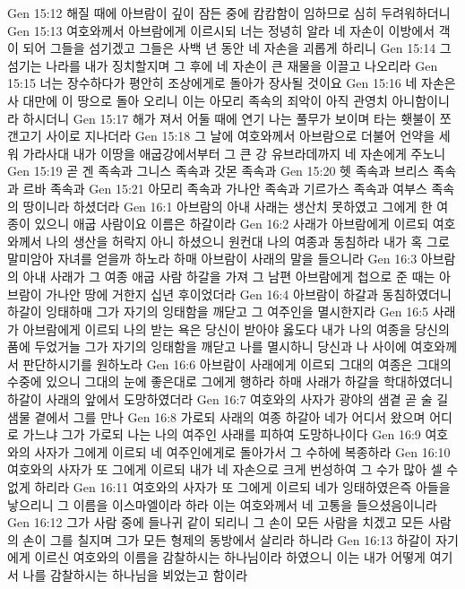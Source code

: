 Gen 15:12  해질 때에 아브람이 깊이 잠든 중에 캄캄함이 임하므로 심히 두려워하더니
Gen 15:13  여호와께서 아브람에게 이르시되 너는 정녕히 알라 네 자손이 이방에서 객이 되어 그들을 섬기겠고 그들은 사백 년 동안 네 자손을 괴롭게 하리니
Gen 15:14  그 섬기는 나라를 내가 징치할지며 그 후에 네 자손이 큰 재물을 이끌고 나오리라
Gen 15:15  너는 장수하다가 평안히 조상에게로 돌아가 장사될 것이요
Gen 15:16  네 자손은 사 대만에 이 땅으로 돌아 오리니 이는 아모리 족속의 죄악이 아직 관영치 아니함이니라 하시더니
Gen 15:17  해가 져서 어둘 때에 연기 나는 풀무가 보이며 타는 횃불이 쪼갠고기 사이로 지나더라
Gen 15:18  그 날에 여호와께서 아브람으로 더불어 언약을 세워 가라사대 내가 이땅을 애굽강에서부터 그 큰 강 유브라데까지 네 자손에게 주노니
Gen 15:19  곧 겐 족속과 그니스 족속과 갓몬 족속과
Gen 15:20  헷 족속과 브리스 족속과 르바 족속과
Gen 15:21  아모리 족속과 가나안 족속과 기르가스 족속과 여부스 족속의 땅이니라 하셨더라
Gen 16:1  아브람의 아내 사래는 생산치 못하였고 그에게 한 여종이 있으니 애굽 사람이요 이름은 하갈이라
Gen 16:2  사래가 아브람에게 이르되 여호와께서 나의 생산을 허락지 아니 하셨으니 원컨대 나의 여종과 동침하라 내가 혹 그로 말미암아 자녀를 얻을까 하노라 하매 아브람이 사래의 말을 들으니라
Gen 16:3  아브람의 아내 사래가 그 여종 애굽 사람 하갈을 가져 그 남편 아브람에게 첩으로 준 때는 아브람이 가나안 땅에 거한지 십년 후이었더라
Gen 16:4  아브람이 하갈과 동침하였더니 하갈이 잉태하매 그가 자기의 잉태함을 깨닫고 그 여주인을 멸시한지라
Gen 16:5  사래가 아브람에게 이르되 나의 받는 욕은 당신이 받아야 옳도다 내가 나의 여종을 당신의 품에 두었거늘 그가 자기의 잉태함을 깨닫고 나를 멸시하니 당신과 나 사이에 여호와께서 판단하시기를 원하노라
Gen 16:6  아브람이 사래에게 이르되 그대의 여종은 그대의 수중에 있으니 그대의 눈에 좋은대로 그에게 행하라 하매 사래가 하갈을 학대하였더니 하갈이 사래의 앞에서 도망하였더라
Gen 16:7  여호와의 사자가 광야의 샘곁 곧 술 길 샘물 곁에서 그를 만나
Gen 16:8  가로되 사래의 여종 하갈아 네가 어디서 왔으며 어디로 가느냐 그가 가로되 나는 나의 여주인 사래를 피하여 도망하나이다
Gen 16:9  여호와의 사자가 그에게 이르되 네 여주인에게로 돌아가서 그 수하에 복종하라
Gen 16:10  여호와의 사자가 또 그에게 이르되 내가 네 자손으로 크게 번성하여 그 수가 많아 셀 수 없게 하리라
Gen 16:11  여호와의 사자가 또 그에게 이르되 네가 잉태하였은즉 아들을 낳으리니 그 이름을 이스마엘이라 하라 이는 여호와께서 네 고통을 들으셨음이니라
Gen 16:12  그가 사람 중에 들나귀 같이 되리니 그 손이 모든 사람을 치겠고 모든 사람의 손이 그를 칠지며 그가 모든 형제의 동방에서 살리라 하니라
Gen 16:13  하갈이 자기에게 이르신 여호와의 이름을 감찰하시는 하나님이라 하였으니 이는 내가 어떻게 여기서 나를 감찰하시는 하나님을 뵈었는고 함이라
